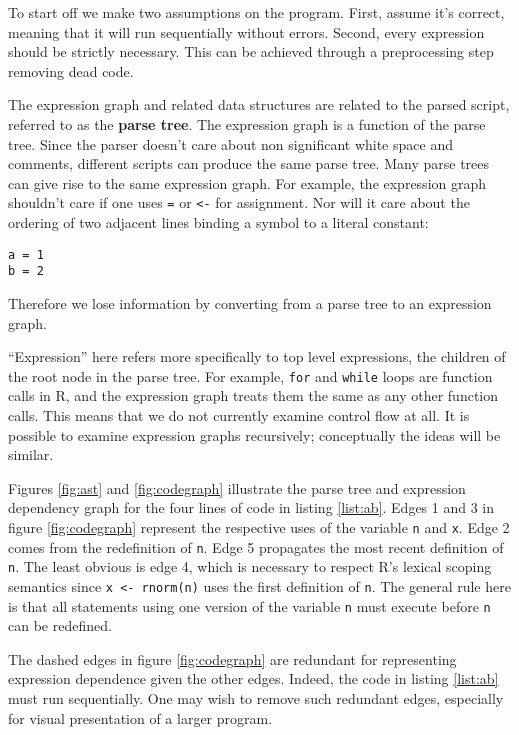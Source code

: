 \documentclass[12pt]{article}
\begin{document}
To start off we make two assumptions on the program. First, assume it's
correct, meaning that it will run sequentially without errors.
Second, every expression should be strictly necessary. This can be achieved
through a preprocessing step removing dead code.

The expression graph and related data structures are related to the parsed
script, referred to as the \textbf{parse tree}. The expression
graph is a function of the parse tree. Since the parser
doesn't care about non significant white space and comments,  different
scripts can produce the same parse tree.  Many parse trees can give rise to
the same expression graph. For example, the expression graph shouldn't care if one uses
\texttt{=} or \texttt{<-} for assignment. Nor will it care about the
ordering of two adjacent lines binding a symbol to a literal constant:

\begin{verbatim}
a = 1
b = 2
\end{verbatim}

Therefore we lose information by converting from a parse tree to an
expression graph.

``Expression'' here refers more specifically to top level expressions, the children of
the root node in the parse tree. For example, \texttt{for} and
\texttt{while} loops are function calls in R, and the expression graph
treats them the same as any other function calls. This means that we do not
currently examine control flow at all. It is possible to examine
expression graphs recursively; conceptually the ideas will be similar.

Figures \ref{fig:ast} and \ref{fig:codegraph} illustrate the 
parse tree and expression dependency graph for the four lines of code in
listing \ref{list:ab}.  Edges 1 and 3 in figure \ref{fig:codegraph} represent the
respective uses of the variable \texttt{n} and \texttt{x}.  Edge 2 comes
from the redefinition of \texttt{n}.  Edge 5 propagates the most recent
definition of \texttt{n}.  The least obvious is edge 4, which is necessary
to respect R's lexical scoping semantics since \texttt{x <- rnorm(n)} uses
the first definition of \texttt{n}. The general rule here is that all
statements using one version of the variable \texttt{n} must execute before \texttt{n}
can be redefined.

The dashed edges in figure \ref{fig:codegraph} are redundant for representing
expression dependence given the other edges. Indeed, the code in
listing \ref{list:ab} must run sequentially. One may wish to remove such
redundant edges, especially for visual presentation of a larger program.
\end{document}
